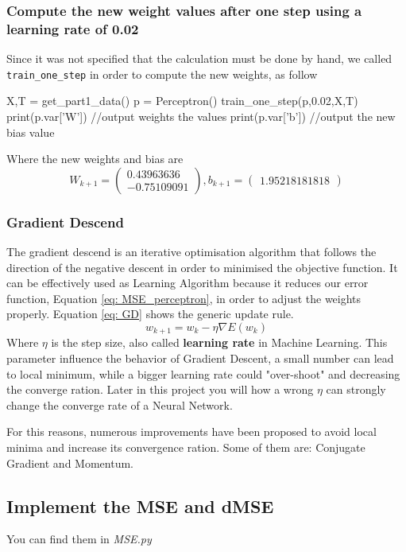 \documentclass[11pt]{article}
\begin{document}
\subsubsection{Compute the new weight values after one step using a learning rate of 0.02}
Since it was not specified that the calculation must be done by hand, we called \texttt{train\_one\_step} in order to compute the new weights, as follow
\begin{python}
X,T = get_part1_data()
p = Perceptron()
train_one_step(p,0.02,X,T)
print(p.var['W']) //output weights the values	
print(p.var['b']) //output the new bias value
\end{python}
Where the new weights and bias are
$$W_{k + 1} = \begin{pmatrix}
 0.43963636 \\
 -0.75109091
\end{pmatrix}, b_{k+1} = \begin{pmatrix}
	1.95218181818
\end{pmatrix}$$
\subsubsection{Gradient Descend}
The gradient descend is an iterative optimisation algorithm that follows the direction of the negative descent in order to minimised the objective function. It can be effectively used as Learning Algorithm because it reduces our error function, Equation \ref{eq: MSE_perceptron}, in order to adjust the weights properly. Equation \ref{eq: GD} shows the generic update rule.
\begin{equation}
\label{eq: GD}
	w_{k + 1} = w_k - \eta \nabla E(w_k)
\end{equation}
Where $\eta$ is the step size, also called \textbf{learning rate} in Machine Learning. This parameter influence the behavior of Gradient Descent, a small number can lead to local minimum, while a bigger learning rate could "over-shoot" and decreasing the converge ration. Later in this project you will how a wrong $\eta$ can strongly change the converge rate of a Neural Network.

For this reasons, numerous improvements have been proposed to avoid local minima and increase its convergence ration. Some of them are: Conjugate Gradient and Momentum.
\subsection{Implement the MSE and dMSE}
You can find them in \emph{MSE.py}
\end{document}
